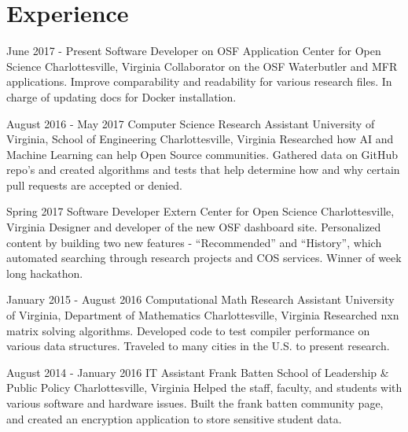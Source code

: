 \documentclass[11pt,a4paper,sans]{moderncv}        %
\begin{document}
\makecvtitle

\section{Experience}


\cventry
  {June 2017 - Present}
  {Software Developer on OSF Application}
  {Center for Open Science}
  {Charlottesville, Virginia}{}
  {Collaborator on the OSF Waterbutler and MFR applications. Improve comparability and readability for various research files. In charge of updating docs for Docker installation.}

\cventry
  {August 2016 - May 2017}
  {Computer Science Research Assistant}
  {University of Virginia, School of Engineering}
  {Charlottesville, Virginia}{}
  {Researched how AI and Machine Learning can help Open Source communities. Gathered data on GitHub repo's and created algorithms and tests that help determine how and why certain pull requests are accepted or denied.}

\cventry
  {Spring 2017}
  {Software Developer Extern}
  {Center for Open Science}
  {Charlottesville, Virginia}{}
  {Designer and developer of the new OSF dashboard site. Personalized content by building two new features -  “Recommended” and “History”, which automated searching through research projects and COS services. Winner of week long hackathon.}

\cventry
  {January 2015 - August 2016}
  {Computational Math Research Assistant}
  {University of Virginia, Department of Mathematics}
  {Charlottesville, Virginia}{}
  {Researched nxn matrix solving algorithms. Developed code to test compiler performance on various data structures. Traveled to many cities in the U.S. to present research.}

\cventry
  {August 2014 - January 2016}
  {IT Assistant}
  {Frank Batten School of Leadership \& Public Policy}
  {Charlottesville, Virginia}{}
  {Helped the staff, faculty, and students with various software and hardware issues. Built the frank batten community page, and created an encryption application to store sensitive student data.}
\end{document}
